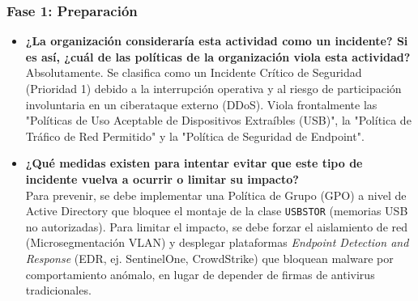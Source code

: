 \documentclass[12pt,a4paper]{article}
\begin{document}
\subsubsection{Fase 1: Preparación}
\begin{itemize}
    \item \textbf{¿La organización consideraría esta actividad como un incidente? Si es así, ¿cuál de las políticas de la organización viola esta actividad?}\\
    Absolutamente. Se clasifica como un Incidente Crítico de Seguridad (Prioridad 1) debido a la interrupción operativa y al riesgo de participación involuntaria en un ciberataque externo (DDoS). Viola frontalmente las "Políticas de Uso Aceptable de Dispositivos Extraíbles (USB)", la "Política de Tráfico de Red Permitido" y la "Política de Seguridad de Endpoint".
    \item \textbf{¿Qué medidas existen para intentar evitar que este tipo de incidente vuelva a ocurrir o limitar su impacto?}\\
    Para prevenir, se debe implementar una Política de Grupo (GPO) a nivel de Active Directory que bloquee el montaje de la clase \texttt{USBSTOR} (memorias USB no autorizadas). Para limitar el impacto, se debe forzar el aislamiento de red (Microsegmentación VLAN) y desplegar plataformas \textit{Endpoint Detection and Response} (EDR, ej. SentinelOne, CrowdStrike) que bloquean malware por comportamiento anómalo, en lugar de depender de firmas de antivirus tradicionales.
\end{itemize}
\end{document}

